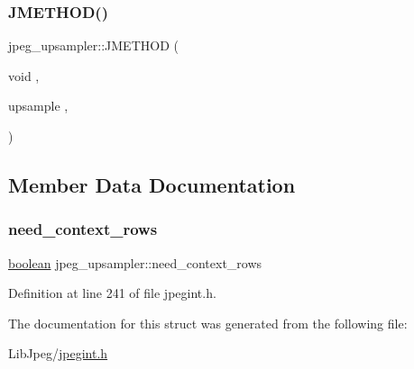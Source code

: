 \subsubsection{\texorpdfstring{JMETHOD()}{JMETHOD()}\hspace{0.1cm}{\footnotesize\ttfamily [2/2]}}
{\footnotesize\ttfamily jpeg\+\_\+upsampler\+::\+J\+M\+E\+T\+H\+OD (\begin{DoxyParamCaption}\item[{void}]{,  }\item[{upsample}]{,  }\item[{(\mbox{\hyperlink{jpeglib_8h_a00c7d78af44bd26a901c791ccfc1e178}{j\+\_\+decompress\+\_\+ptr}} cinfo, \mbox{\hyperlink{jpeglib_8h_a4bf858e4d42202287e786bdec2f3b62b}{J\+S\+A\+M\+P\+I\+M\+A\+GE}} input\+\_\+buf, \mbox{\hyperlink{jmorecfg_8h_a04ed4674f6f1d0d50ec241531e38274f}{J\+D\+I\+M\+E\+N\+S\+I\+ON}} $\ast$in\+\_\+row\+\_\+group\+\_\+ctr, \mbox{\hyperlink{jmorecfg_8h_a04ed4674f6f1d0d50ec241531e38274f}{J\+D\+I\+M\+E\+N\+S\+I\+ON}} in\+\_\+row\+\_\+groups\+\_\+avail, \mbox{\hyperlink{jpeglib_8h_ac9d5d1b829ed51769db69a37271a7e91}{J\+S\+A\+M\+P\+A\+R\+R\+AY}} \mbox{\hyperlink{jdct_8h_ad7e4660a191b1a791748dd44d5a7a0ec}{output\+\_\+buf}}, \mbox{\hyperlink{jmorecfg_8h_a04ed4674f6f1d0d50ec241531e38274f}{J\+D\+I\+M\+E\+N\+S\+I\+ON}} $\ast$out\+\_\+row\+\_\+ctr, \mbox{\hyperlink{jmorecfg_8h_a04ed4674f6f1d0d50ec241531e38274f}{J\+D\+I\+M\+E\+N\+S\+I\+ON}} out\+\_\+rows\+\_\+avail)}]{ }\end{DoxyParamCaption})}



\subsection{Member Data Documentation}
\mbox{\label{structjpeg__upsampler_af1ed2e1ca01280221b9c1305fc557e45}} 
\subsubsection{\texorpdfstring{need\_context\_rows}{need\_context\_rows}}
{\footnotesize\ttfamily \mbox{\hyperlink{jmorecfg_8h_a7c6368b321bd9acd0149b030bb8275ed}{boolean}} jpeg\+\_\+upsampler\+::need\+\_\+context\+\_\+rows}



Definition at line 241 of file jpegint.\+h.



The documentation for this struct was generated from the following file\+:\begin{DoxyCompactItemize}
\item 
Lib\+Jpeg/\mbox{\hyperlink{jpegint_8h}{jpegint.\+h}}\end{DoxyCompactItemize}
